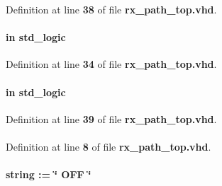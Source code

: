 Definition at line {\bf 38} of file {\bf rx\+\_\+path\+\_\+top.\+vhd}.

\paragraph[{fidm}]{ {\bfseries \textcolor{keywordflow}{in}\textcolor{vhdlchar}{ }} {\bfseries \textcolor{comment}{std\+\_\+logic}\textcolor{vhdlchar}{ }} \hspace{0.3cm}{\ttfamily [Port]}}\label{classrx__path__top_a97ae5ad9eee26d5f984f95d151f62ec0}


Definition at line {\bf 34} of file {\bf rx\+\_\+path\+\_\+top.\+vhd}.

\paragraph[{fsync}]{ {\bfseries \textcolor{keywordflow}{in}\textcolor{vhdlchar}{ }} {\bfseries \textcolor{comment}{std\+\_\+logic}\textcolor{vhdlchar}{ }} \hspace{0.3cm}{\ttfamily [Port]}}\label{classrx__path__top_a82b050363ba0e67b732026adcc5c4398}


Definition at line {\bf 39} of file {\bf rx\+\_\+path\+\_\+top.\+vhd}.

\paragraph[{ieee}]{\hspace{0.3cm}{\ttfamily [Library]}}\label{classrx__path__top_a0a6af6eef40212dbaf130d57ce711256}


Definition at line {\bf 8} of file {\bf rx\+\_\+path\+\_\+top.\+vhd}.

\paragraph[{invert\+\_\+input\+\_\+clocks}]{ {\bfseries \textcolor{vhdlchar}{ }} {\bfseries \textcolor{comment}{string}\textcolor{vhdlchar}{ }\textcolor{vhdlchar}{ }\textcolor{vhdlchar}{\+:}\textcolor{vhdlchar}{=}\textcolor{vhdlchar}{ }\textcolor{vhdlchar}{ }\textcolor{vhdlchar}{ }\textcolor{vhdlchar}{ }\textcolor{keyword}{\char`\"{} O\+F\+F \char`\"{}}\textcolor{vhdlchar}{ }} \hspace{0.3cm}{\ttfamily [Generic]}}\label{classrx__path__top_ab78cd55df77fd5313ad7d36c25202c2b}



